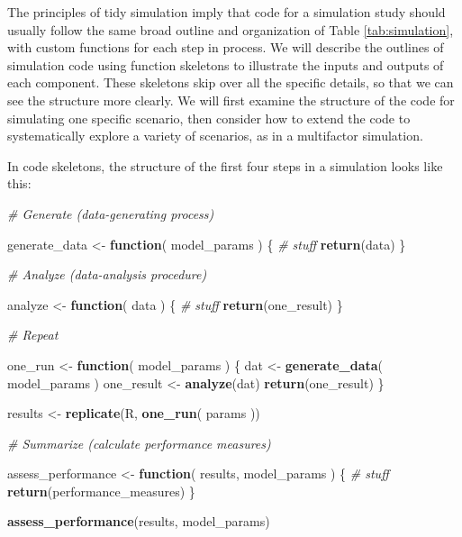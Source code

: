 \documentclass[
]{book}
\newenvironment{Shaded}{\begin{snugshade}}{\end{snugshade}}
\newcommand{\CommentTok}[1]{\textcolor[rgb]{0.56,0.35,0.01}{\textit{#1}}}
\newcommand{\ControlFlowTok}[1]{\textcolor[rgb]{0.13,0.29,0.53}{\textbf{#1}}}
\newcommand{\FunctionTok}[1]{\textcolor[rgb]{0.13,0.29,0.53}{\textbf{#1}}}
\newcommand{\NormalTok}[1]{#1}
\newcommand{\OtherTok}[1]{\textcolor[rgb]{0.56,0.35,0.01}{#1}}
\begin{document}
The principles of tidy simulation imply that code for a simulation study should usually follow the same broad outline and organization of Table \ref{tab:simulation}, with custom functions for each step in process.
We will describe the outlines of simulation code using function skeletons to illustrate the inputs and outputs of each component.
These skeletons skip over all the specific details, so that we can see the structure more clearly.
We will first examine the structure of the code for simulating one specific scenario, then consider how to extend the code to systematically explore a variety of scenarios, as in a multifactor simulation.

In code skeletons, the structure of the first four steps in a simulation looks like this:

\begin{Shaded}
\begin{Highlighting}[]
\CommentTok{\# Generate (data{-}generating process)}

\NormalTok{generate\_data }\OtherTok{\textless{}{-}} \ControlFlowTok{function}\NormalTok{( model\_params ) \{}
  \CommentTok{\# stuff}
  \FunctionTok{return}\NormalTok{(data)}
\NormalTok{\}}

\CommentTok{\# Analyze (data{-}analysis procedure)}

\NormalTok{analyze }\OtherTok{\textless{}{-}} \ControlFlowTok{function}\NormalTok{( data ) \{}
  \CommentTok{\# stuff}
  \FunctionTok{return}\NormalTok{(one\_result)}
\NormalTok{\}}

\CommentTok{\# Repeat}

\NormalTok{one\_run }\OtherTok{\textless{}{-}} \ControlFlowTok{function}\NormalTok{( model\_params ) \{}
\NormalTok{  dat }\OtherTok{\textless{}{-}} \FunctionTok{generate\_data}\NormalTok{( model\_params )}
\NormalTok{  one\_result }\OtherTok{\textless{}{-}} \FunctionTok{analyze}\NormalTok{(dat)}
  \FunctionTok{return}\NormalTok{(one\_result)}
\NormalTok{\}}

\NormalTok{results }\OtherTok{\textless{}{-}} \FunctionTok{replicate}\NormalTok{(R, }\FunctionTok{one\_run}\NormalTok{( params ))}

\CommentTok{\# Summarize (calculate performance measures)}

\NormalTok{assess\_performance }\OtherTok{\textless{}{-}} \ControlFlowTok{function}\NormalTok{( results, model\_params ) \{}
  \CommentTok{\# stuff}
  \FunctionTok{return}\NormalTok{(performance\_measures)}
\NormalTok{\}}

\FunctionTok{assess\_performance}\NormalTok{(results, model\_params)}
\end{Highlighting}
\end{Shaded}
\end{document}
